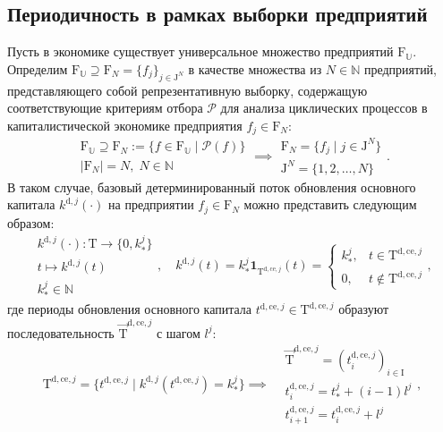 \subsection{Периодичность в рамках выборки предприятий}
Пусть в экономике существует универсальное множество предприятий $\mathrm{F}_{\mathbb{U}}$. Определим $\mathrm{F}_{\mathbb{U}} \supseteq \mathrm F_N = \{f_j\}_{j \in \mathrm{J}^{N}}$ в качестве множества из $N \in \mathbb N$ предприятий, представляющего собой репрезентативную выборку, содержащую соответствующие критериям отбора $\mathcal{P}$ для анализа циклических процессов в капиталистической экономике предприятия $f_j \in \mathrm{F}_{N}$:
\begin{equation}\begin{aligned} \mathrm{F}_{\mathbb{U}} \supseteq \mathrm F_N := \{f \in \mathrm{F}_{\mathbb{U}} \mid \mathcal{P}(f)\} \\ |\mathrm{F}_{N}| = N, \; N \in \mathbb N \end{aligned} \implies \begin{aligned} \mathrm{F}_{N} = \{f_j \mid j \in \mathrm{J}^{N} \} \\ \mathrm{J}^{N} = \{ 1,2,\dots,N\} \end{aligned}.\end{equation}
В таком случае, базовый детерминированный поток обновления основного капитала $k^{\mathrm{d},j}(\cdot)$ на предприятии $f_j \in \mathrm{F}_{N}$ можно представить следующим образом:
\begin{equation}\begin{aligned} k^{\mathrm{d},j}(\cdot) : \mathrm{T} \longrightarrow \{0, k^{j}_{*} \} \\ t \longmapsto k^{\mathrm{d},j}(t) \\ k^{j}_{*} \in \mathbb{N} \end{aligned}, \quad k^{\mathrm{d},j}(t)=k^{j}_{*} \mathbf{1}_{\mathrm{T}^{\mathrm{d,ce},j}}(t) = \begin{cases} k^{j}_{*}, &t \in \mathrm{T}^{\mathrm{d,ce},j} \\ 0, &t \not\in \mathrm{T}^{\mathrm{d,ce},j} \end{cases},\end{equation}
где периоды обновления основного капитала $t^{\mathrm{d,ce},j} \in \mathrm{T}^{\mathrm{d,ce},j}$ образуют последовательность $\overrightarrow{\mathrm{T}}^{\mathrm{d,ce},j}$ с шагом $l^{j}$:
\begin{equation}\mathrm{T}^{\mathrm{d,ce},j} = \{t^{\mathrm{d,ce},j} \mid k^{\mathrm{d},j}(t^{\mathrm{d,ce},j}) = k^{j}_{*}\} \implies \begin{aligned} &\overrightarrow{\mathrm{T}}^{\mathrm{d,ce},j} = (t^{\mathrm{d,ce},j}_{i})_{i \in \mathrm{I}} \\ &t^{\mathrm{d,ce},j}_{i} = t^{j}_{*} + (i - 1)l^{j} \\ &t^{\mathrm{d,ce},j}_{i+1} = t^{\mathrm{d,ce},j}_{i} + l^{j} \end{aligned},\end{equation}
